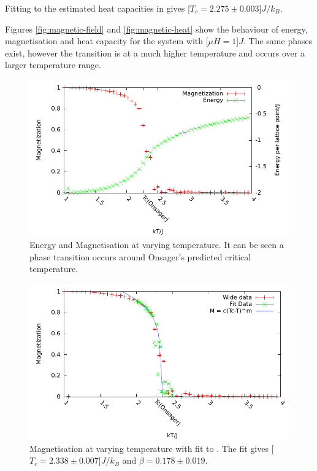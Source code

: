 \documentclass[12pt,a4paper,english]{article}
\begin{document}
Fitting  to the estimated heat capacities in  gives \unit[$T_c=2.275\pm0.003$]{$J/k_B$}.

Figures \ref{fig:magnetic-field} and \ref{fig:magnetic-heat} show the behaviour of energy, magnetisation and heat capacity for the system with \unit[$\mu H = 1$]{$J$}. The same phases exist, however the transition is at a much higher temperature and occurs over a larger temperature range.

\begin{figure}
\center
\includegraphics[width=\textwidth]{Optimized/tests/ising.pdf}
\caption{Energy and Magnetisation at varying temperature. It can be seen a phase transition occurs around Onsager's predicted critical temperature.}\label{fig:ising}
\end{figure}

\begin{figure}
\center
\includegraphics[width=\textwidth]{Optimized/tests/detail.pdf}
\caption{Magnetisation at varying temperature with fit to . The fit gives \unit[$T_c=2.338\pm0.007$]{$J/k_B$} and $\beta=0.178\pm0.019$.}\label{fig:detail}
\end{figure}
\end{document}
